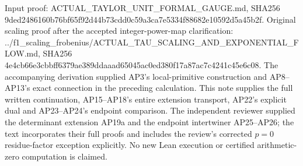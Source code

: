 Input proof: ACTUAL\_TAYLOR\_UNIT\_FORMAL\_GAUGE.md, SHA256 9ded2486160b76bf65f92d44b73cdd0c59a3ca7e5334f88682e10592d5a45b2f. Original scaling proof after the accepted integer-power-map clarification: ../f1\_scaling\_frobenius/ACTUAL\_TAU\_SCALING\_AND\_EXPONENTIAL\_FLOW.md, SHA256 4e4cb66e3cbbff6379ae389ddaaad65045ac0ed380f17a87ac7c4241c45e6c08. The accompanying derivation supplied AP3's local-primitive construction and AP8--AP13's exact connection in the preceding calculation. This note supplies the full written continuation, AP15--AP18's entire extension transport, AP22's explicit dual and AP23--AP24's endpoint comparison. The independent reviewer supplied the determinant extension AP19a and the endpoint intertwiner AP25--AP26; the text incorporates their full proofs and includes the review's corrected \(p=0\) residue-factor exception explicitly. No new Lean execution or certified arithmetic-zero computation is claimed.
